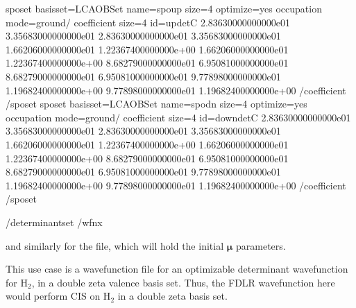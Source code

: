 \documentclass[letterpaper,10pt,english]{sphinxmanual}
\begin{document}
\begin{sphinxVerbatim}[commandchars=\\\{\}]
      \PYGZlt{}sposet basisset=\PYGZdq{}LCAOBSet\PYGZdq{} name=\PYGZdq{}spo\PYGZhy{}up\PYGZdq{} size=\PYGZdq{}4\PYGZdq{} optimize=\PYGZdq{}yes\PYGZdq{}\PYGZgt{}
        \PYGZlt{}occupation mode=\PYGZdq{}ground\PYGZdq{}/\PYGZgt{}
        \PYGZlt{}coefficient size=\PYGZdq{}4\PYGZdq{} id=\PYGZdq{}updetC\PYGZdq{}\PYGZgt{}
  2.83630000000000e\PYGZhy{}01  3.35683000000000e\PYGZhy{}01  2.83630000000000e\PYGZhy{}01  3.35683000000000e\PYGZhy{}01
  1.66206000000000e\PYGZhy{}01  1.22367400000000e+00 \PYGZhy{}1.66206000000000e\PYGZhy{}01 \PYGZhy{}1.22367400000000e+00
  8.68279000000000e\PYGZhy{}01 \PYGZhy{}6.95081000000000e\PYGZhy{}01  8.68279000000000e\PYGZhy{}01 \PYGZhy{}6.95081000000000e\PYGZhy{}01
 \PYGZhy{}9.77898000000000e\PYGZhy{}01  1.19682400000000e+00  9.77898000000000e\PYGZhy{}01 \PYGZhy{}1.19682400000000e+00
\PYGZlt{}/coefficient\PYGZgt{}
      \PYGZlt{}/sposet\PYGZgt{}
      \PYGZlt{}sposet basisset=\PYGZdq{}LCAOBSet\PYGZdq{} name=\PYGZdq{}spo\PYGZhy{}dn\PYGZdq{} size=\PYGZdq{}4\PYGZdq{} optimize=\PYGZdq{}yes\PYGZdq{}\PYGZgt{}
        \PYGZlt{}occupation mode=\PYGZdq{}ground\PYGZdq{}/\PYGZgt{}
        \PYGZlt{}coefficient size=\PYGZdq{}4\PYGZdq{} id=\PYGZdq{}downdetC\PYGZdq{}\PYGZgt{}
  2.83630000000000e\PYGZhy{}01  3.35683000000000e\PYGZhy{}01  2.83630000000000e\PYGZhy{}01  3.35683000000000e\PYGZhy{}01
  1.66206000000000e\PYGZhy{}01  1.22367400000000e+00 \PYGZhy{}1.66206000000000e\PYGZhy{}01 \PYGZhy{}1.22367400000000e+00
  8.68279000000000e\PYGZhy{}01 \PYGZhy{}6.95081000000000e\PYGZhy{}01  8.68279000000000e\PYGZhy{}01 \PYGZhy{}6.95081000000000e\PYGZhy{}01
 \PYGZhy{}9.77898000000000e\PYGZhy{}01  1.19682400000000e+00  9.77898000000000e\PYGZhy{}01 \PYGZhy{}1.19682400000000e+00
\PYGZlt{}/coefficient\PYGZgt{}
      \PYGZlt{}/sposet\PYGZgt{}

    \PYGZlt{}/determinantset\PYGZgt{}
\PYGZlt{}/wfn\PYGZus{}x\PYGZgt{}
\end{sphinxVerbatim}

and similarly for the  file, which will hold the initial
\(\mathbf{\mu}\) parameters.

This use case is a wavefunction file for an optimizable determinant
wavefunction for H\(_2\), in a double zeta valence basis set.
Thus, the FDLR wavefunction here would perform CIS on H\(_2\) in a
double zeta basis set.
\end{document}
